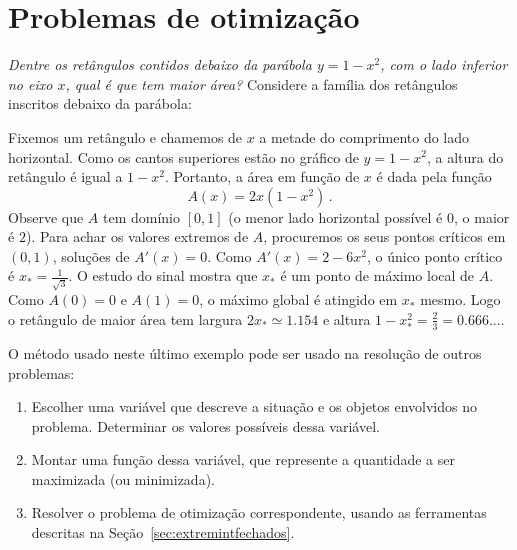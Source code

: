 \section{Problemas de otimização}
\begin{ex} 
\emph{Dentre os retângulos contidos debaixo da parábola $y=1-x^2$, com o
lado inferior no eixo $x$, qual é que tem maior área?}
Considere a família dos retângulos inscritos debaixo da parábola:
\begin{center}
\begin{bmlimage}\end{bmlimage}
\end{center}
Fixemos um retângulo e chamemos de
$x$ a metade do comprimento do lado horizontal.
Como os cantos superiores estão
no gráfico de $y=1-x^2$, a altura do retângulo é
igual a $1-x^2$. Portanto, a área em função de $x$ é 
dada pela função $$A(x)=2x(1-x^2)\,.$$
Observe que $A$ tem domínio $[0,1]$ (o menor lado horizontal possível é $0$, o
maior é
$2$). 
Para achar os valores extremos de $A$, procuremos os seus pontos críticos em
$(0,1)$, soluções de $A'(x)=0$.
Como $A'(x)=2-6x^2$, o único ponto crítico é
$x_*=\frac{1}{\sqrt{3}}$. O estudo do
sinal mostra que $x_*$ 
é um ponto de máximo local de $A$. Como $A(0)=0$ e
$A(1)=0$, o máximo global é atingido em $x_*$ mesmo. Logo o retângulo de
maior área tem largura $2x_*\simeq 1.154$ e altura
$1-x_*^2=\frac{2}{3}=0.666\dots$.
\end{ex}

O método usado neste último exemplo pode ser usado na resolução de
outros problemas: 
\begin{enumerate}
\item Escolher uma variável que descreve a situação e os
objetos envolvidos no problema. Determinar os valores possíveis dessa
variável.
\item Montar uma função dessa variável, que represente a quantidade a
ser maximizada (ou minimizada).
\item Resolver o problema de otimização correspondente, usando as
ferramentas descritas na Seção~\ref{sec:extremintfechados}.
\end{enumerate}

